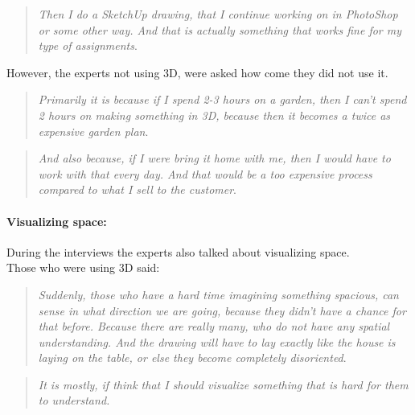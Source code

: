 		\begin{quote}
			\textit{Then I do a SketchUp drawing, that I continue working on in PhotoShop or some other way. And that is actually something that works fine for my type of assignments}\label{quote:expertTech2}.\\
		\end{quote}
		
		However, the experts not using 3D, were asked how come they did not use it.\\
		
		\begin{quote}
			\textit{Primarily it is because if I spend 2-3 hours on a garden, then I can't spend 2 hours on making something in 3D, because then it becomes a twice as expensive garden plan}\label{quote:expertTech3}.\\
		\end{quote}
		
		\begin{quote}
			\textit{And also because, if I were bring it home with me, then I would have to work with that every day. And that would be a too expensive process compared to what I sell to the customer}\label{quote:expertTech4}.\\
		\end{quote}
		
		\paragraph*{Visualizing space:}
		During the interviews the experts also talked about visualizing space.\\
		Those who were using 3D said:\\
		
		\begin{quote}
			\textit{Suddenly, those who have a hard time imagining something spacious, can sense in what direction we are going, because they didn't have a chance for that before. Because there are really many, who do not have any spatial understanding. And the drawing will have to lay exactly like the house is laying on the table, or else they become completely disoriented}\label{quote:expertRoom1}.\\
		\end{quote}
	
		\begin{quote}
			\textit{It is mostly, if think that I should visualize something that is hard for them to understand.}\label{quote:expertRoom2}\\
		\end{quote}

